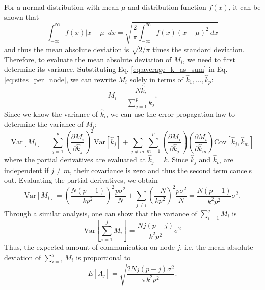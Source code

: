 For a normal distribution with mean $\mu$ and distribution function
$f(x)$, it can be shown that
\begin{equation}
  \int_{-\infty}^{\infty} f(x) \left | x - \mu \right | \: dx =
  \sqrt{\frac{2}{\pi} \int_{-\infty}^{\infty} f(x) \left ( x - \mu
    \right )^2 \: dx}
\end{equation}
and thus the mean absolute deviation is $\sqrt{2/\pi}$ times the
standard deviation. Therefore, to evaluate the mean absolute deviation
of $M_i$, we need to first determine its variance. Substituting
Eq. \ref{eq:average_k_as_sum} in Eq. \ref{eq:sites_per_node}, we can
rewrite $M_i$ solely in terms of $\hat{k}_1, \dots, \hat{k}_p$:
\begin{equation}
  M_i = \frac{N \hat{k}_i}{\sum\limits_{j=1}^p \hat{k}_j}.
\end{equation}
Since we know the variance of $\hat{k}_i$, we can use the error
propagation law to determine the variance of $M_i$:
\begin{equation}
  \text{Var} \left [ M_i \right ] = \sum_{j=1}^p \left (
  \frac{\partial M_i}{\partial \hat{k}_j} \right )^2 \text{Var} \left
       [ \hat{k}_j \right ] + \sum\limits_{j \neq m}
       \sum\limits_{m=1}^p \left ( \frac{\partial M_i}{\partial
         \hat{k}_j} \right ) \left ( \frac{\partial M_i}{\partial
         \hat{k}_m} \right ) \text{Cov} \left [ \hat{k}_j, \hat{k}_m
         \right ]
\end{equation}
where the partial derivatives are evaluated at $\hat{k}_j = k$. Since
$\hat{k}_j$ and $\hat{k}_m$ are independent if $j \neq m$, their
covariance is zero and thus the second term cancels out. Evaluating
the partial derivatives, we obtain
\begin{equation}
  \text{Var} \left [ M_i \right ] = \left ( \frac{N(p-1)}{kp^2} \right
  )^2 \frac{p\sigma^2}{N} + \sum_{j \neq i} \left ( \frac{-N}{kp^2}
  \right )^2 \frac{p\sigma^2}{N} = \frac{N(p-1)}{k^2p^2} \sigma^2.
\end{equation}
Through a similar analysis, one can show that the variance of
$\sum_{i=1}^j M_i$ is
\begin{equation}
  \text{Var} \left [ \sum_{i=1}^j M_i \right ] =
  \frac{Nj(p-j)}{k^2p^2} \sigma^2
\end{equation}
Thus, the expected amount of communication on node $j$, i.e. the mean
absolute deviation of $\sum_{i=1}^j M_i$ is proportional to
\begin{equation}\label{eq:comm-cost}
  E \left [ \Lambda_j \right ] = \sqrt{\frac{2Nj(p-j)\sigma^2}{\pi
      k^2p^2}}.
\end{equation}
